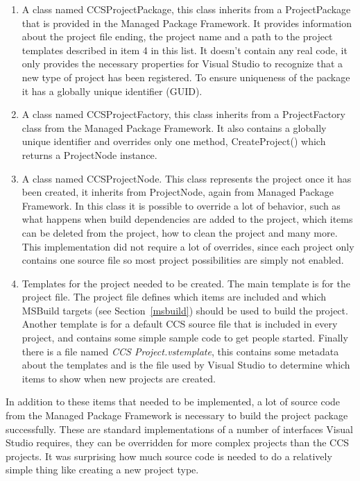 	\begin{enumerate}
		\item A class named \textsf{CCSProjectPackage}, this class inherits from 
		a \textsf{ProjectPackage} that is provided in the Managed Package 
		Framework. It provides information about the project file ending, the 
		project name and a path to the project templates described in item 4 in 
		this list. It doesn't contain any real code, it only provides the 
		necessary properties for Visual Studio to recognize that a new type of 
		project has been registered. To ensure uniqueness of the package it has a 
		globally unique identifier (GUID).
		
		\item A class named \textsf{CCSProjectFactory}, this class inherits from 
		a \textsf{ProjectFactory} class from the Managed Package Framework. It 
		also contains a globally unique identifier and overrides only one method, 
		\textsf{CreateProject()} which returns a \textsf{ProjectNode} instance.
		
		\item A class named \textsf{CCSProjectNode}. This class represents the 
		project once it has been created, it inherits from \textsf{ProjectNode}, 
		again from Managed Package Framework. In this class it is possible to 
		override a lot of behavior, such as what happens when build dependencies 
		are added to the project, which items can be deleted from the project, how 
		to clean the project and many more. This implementation did not require a 
		lot of overrides, since each project only contains one source file so most 
		project possibilities are simply not enabled.
		
		\item Templates for the project needed to be created. The main template is 
		for the project file. The project file defines which items are included 
		and which MSBuild targets (see Section~\ref{msbuild}) should be used to
		build the project. Another template is for a default CCS source file that 
		is included in every project, and contains some simple sample code to get 
		people started. Finally there is a file named \textit{CCS 
		Project.vstemplate}, this contains some metadata about the templates and 
		is the file used by Visual Studio to determine which items to show when 
		new projects are created.
	
	\end{enumerate}
	
	In addition to these items that needed to be implemented, a lot of source 
	code from the Managed Package Framework is necessary to build the project 
	package successfully. These are standard implementations of a number of 
	interfaces Visual Studio requires, they can be overridden for more complex 
	projects than the CCS projects. It was surprising how much source code is 
	needed to do a relatively simple thing like creating a new project type.
	
